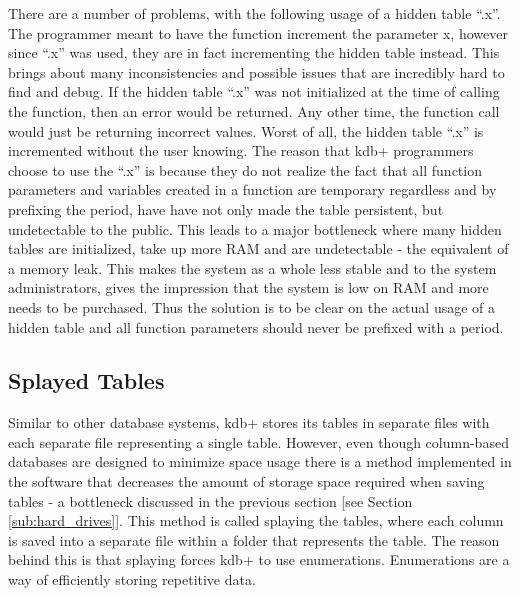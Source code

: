 There are a number of problems, with the following usage of a hidden table ``.x''.  The programmer meant to have the function increment the parameter x, however since ``.x'' was used, they are in fact incrementing the hidden table instead.  This brings about many inconsistencies and possible issues that are incredibly hard to find and debug.  If the hidden table ``.x'' was not initialized at the time of calling the function, then an error would be returned.  Any other time, the function call would just be returning incorrect values.  Worst of all, the hidden table ``.x'' is incremented without the user knowing. The reason that kdb+ programmers choose to use the ``.x'' is because they do not realize the fact that all function parameters and variables created in a function are temporary regardless and by prefixing the period, have have not only made the table persistent, but undetectable to the public.  This leads to a major bottleneck where many hidden tables are initialized, take up more RAM and are undetectable - the equivalent of a memory leak.  This makes the system as a whole less stable and to the system administrators, gives the impression that the system is low on RAM and more needs to be purchased.  Thus the solution is to be clear on the actual usage of a hidden table and all function parameters should never be prefixed with a period.

\subsection{Splayed Tables} %
\label{sub:splayed tables}
Similar to other database systems, kdb+ stores its tables in separate files with each separate file representing a single table.  However, even though column-based databases are designed to minimize space usage there is a method implemented in the software that decreases the amount of storage space required when saving tables - a bottleneck discussed in the previous section [see Section \ref{sub:hard_drives}].  This method is called splaying the tables, where each column is saved into a separate file within a folder that represents the table.  The reason behind this is that splaying forces kdb+ to use enumerations.  Enumerations are a way of efficiently storing repetitive data.\newline

